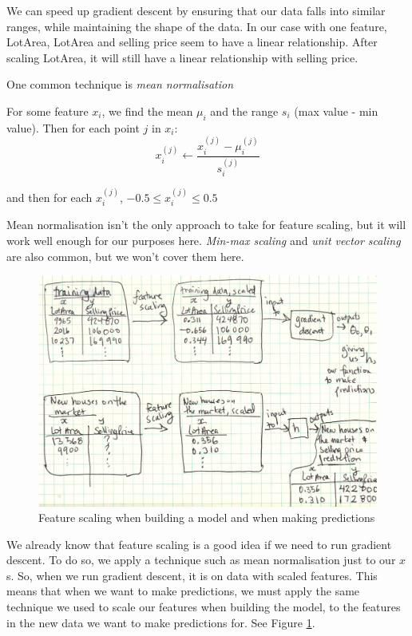 \documentclass[11pt]{article}
\begin{document}
    We can speed up gradient descent by ensuring that our data falls into similar ranges, while maintaining the shape of the data. In our case with one feature, LotArea, LotArea and selling price seem to have a linear relationship. After scaling LotArea, it will still have a linear relationship with selling price. 

    One common technique is \textit{mean normalisation}

    For some feature $x_i$, we find the mean $\mu_i$ and the range $s_i$ (max value - min value). Then for each point $j$ in $x_i$:
    \[
        x_i^{(j)} \leftarrow \frac{x_i^{(j)} - \mu_i^{(j)}}{s_i^{(j)}}
    \]

    and then for each $x_i^{(j)} $, $-0.5 \leq x_i^{(j)}  \leq 0.5$
    
    Mean normalisation isn't the only approach to take for feature scaling, but it will work well enough for our purposes here. \textit{Min-max scaling} and \textit{unit vector scaling} are also common, but we won't cover them here. 
    
    
    \begin{figure}
        \includegraphics[width=\textwidth]{feature-scaling-data}
        \caption{Feature scaling when building a model and when making predictions }
        \label{fig:feature-scaling-data}
    \end{figure}
    
    We already know that feature scaling is a good idea if we need to run gradient descent. To do so, we apply a technique such as mean normalisation just to our $x$s.  So, when we run gradient descent, it is on data with scaled features. This means that when we want to make predictions, we must apply the same technique we used to scale our features when building the model, to the features in the new data we want to make predictions for. See Figure \ref{fig:feature-scaling-data}.
\end{document}
